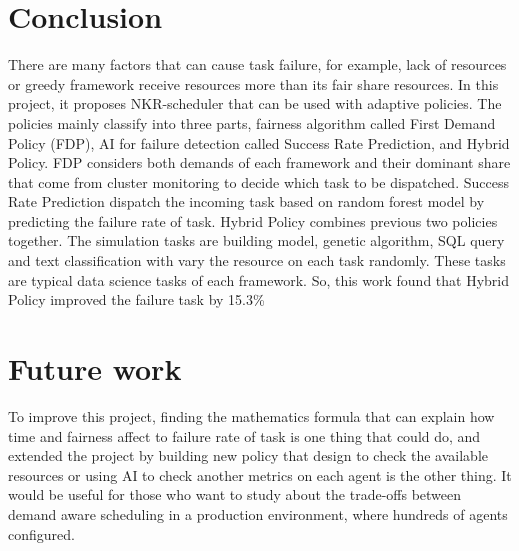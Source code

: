 \documentclass[12pt,oneside,openright,a4paper]{cpe-english-project}
\begin{document}
\section{Conclusion}
\hspace{10mm}There are many factors that can cause task failure, for example, lack of resources or greedy framework receive resources more than its fair share resources. In this project, it proposes NKR-scheduler that can be used with adaptive policies. The policies mainly classify into three parts, fairness algorithm called First Demand Policy (FDP), AI for failure detection called Success Rate Prediction, and Hybrid Policy. FDP considers both demands of each framework and their dominant share that come from cluster monitoring to decide which task to be dispatched. Success Rate Prediction dispatch the incoming task based on random forest model by predicting the failure rate of task. Hybrid Policy combines previous two policies together. The simulation tasks are building model, genetic algorithm, SQL query and text classification with vary the resource on each task randomly. These tasks are typical data science tasks of each framework. So, this work found that Hybrid Policy improved the failure task by 15.3\%

\section{Future work}
\hspace{10mm}To improve this project, finding the mathematics formula that can explain how time and fairness affect to failure rate of task is one thing that could do, and extended the project by building new policy that design to check the available resources or using AI to check another metrics on each agent is the other thing. It would be useful for those who want to study about the trade-offs between demand aware scheduling in a production environment, where hundreds of agents configured.

\nocite{*}


\end{document}

